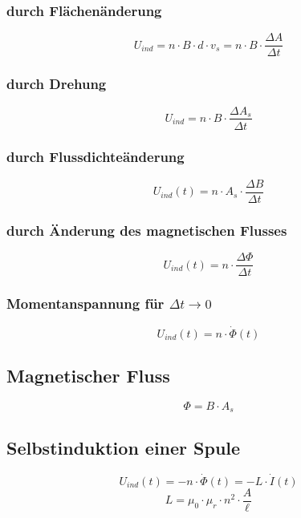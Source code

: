 \subsubsection{durch Flächenänderung}
\begin{equation}\label{eq:magnetische:induktion:flaechenaenderung}
U_{ind} = n \cdot B \cdot d \cdot v_s = n \cdot B \cdot \frac{\Delta A}{\Delta t}
\end{equation}

\subsubsection{durch Drehung}
\begin{equation}\label{eq:magnetische:induktion:drehung}
U_{ind} = n \cdot B \cdot \frac{\Delta A_s}{\Delta t}
\end{equation}

\subsubsection{durch Flussdichteänderung}
\begin{equation}\label{eq:magnetische:induktion:flussdichteaenderung}
U_{ind}(t) = n \cdot A_s \cdot \frac{\Delta B}{\Delta t}
\end{equation}
  
\subsubsection{durch Änderung des magnetischen Flusses}
\begin{equation}\label{eq:magnetische:induktion:flussaenderung}
U_{ind}(t) = n \cdot \frac{\Delta \Phi}{\Delta t}
\end{equation}

\subsubsection{Momentanspannung für $\Delta t \to 0$}
\begin{equation}\label{eq:magnetische:induktion:momentanspannung}
U_{ind}(t) = n \cdot \dot{\Phi}(t)
\end{equation}

\subsection{Magnetischer Fluss}
\begin{equation}\label{eq:magnetischer:fluss}
\Phi = B \cdot A_s
\end{equation}

\subsection{Selbstinduktion einer Spule}
\begin{equation}\label{eq:spule:selbstinduktion}
U_{ind}(t) = - n \cdot \dot{\Phi}(t) = - L \cdot \dot{I}(t)
\end{equation}
\begin{equation}\label{eq:spule:induktivitaet}
L = \mu_0\cdot
\mu_r \cdot n^2 \cdot \frac{A}{\ell}
\end{equation}